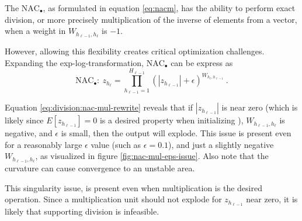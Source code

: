 The $\text{NAC}_{\bullet}$, as formulated in equation \ref{eq:nacm}, has the ability to perform exact division, or more precisely multiplication of the inverse of elements from a vector, when a weight in $W_{h_{\ell-1},h_\ell}$ is $-1$.

However, allowing this flexibility creates critical optimization challenges. Expanding the exp-log-transformation, $\text{NAC}_{\bullet}$ can be express as
\begin{equation}
\textrm{NAC}_\bullet:\ z_{h_\ell} = \prod_{h_{\ell-1}=1}^{H_{\ell-1}} (|z_{h_{\ell-1}}| + \epsilon)^{W_{h_{\ell}, h_{\ell-1}}}\ .
\label{eq:division:nac-mul-rewrite}
\end{equation}

Equation \eqref{eq:division:nac-mul-rewrite} reveals that if $|z_{h_{\ell-1}}|$ is near zero (which is likely since $E[z_{h_{\ell-1}}] = 0$ is a desired property when initializing \cite{glorot-initialization}), $W_{h_{\ell-1},h_\ell}$ is negative, and $\epsilon$ is small, then the output will explode. This issue is present even for a reasonably large $\epsilon$ value (such as $\epsilon = 0.1$), and just a slightly negative $W_{h_{\ell-1},h_\ell}$, as visualized in figure \ref{fig:nac-mul-eps-issue}. Also note that the curvature can cause convergence to an unstable area.

This singularity issue, is present even when multiplication is the desired operation. Since a multiplication unit should not explode for $z_{h_{\ell-1}}$ near zero, it is likely that  supporting division is infeasible.


